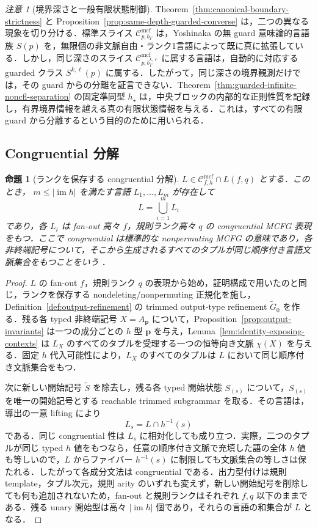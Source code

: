 \documentclass[11pt,a4paper]{ltjsarticle}
\numberwithin{equation}{section}
\theoremstyle{plain}
\newtheorem{proposition}[theorem]{命題}
\theoremstyle{definition}
\theoremstyle{remark}
\newtheorem{remark}[theorem]{注意}
\newcommand{\Cmcf}[2]{\mathcal{C}^{\mathrm{mcf}}_{#1,#2}}
\begin{document}
\begin{remark}[境界深さと一般有限状態制御]
Theorem~\ref{thm:canonical-boundary-strictness} と Proposition~\ref{prop:same-depth-guarded-converse} は，二つの異なる現象を切り分ける．標準スライス $\Cmcf{p}{b_\Gamma}$ は，Yoshinaka の無 guard 意味論的言語族 $S(p)$ を，無限個の非文脈自由・ランク1言語によって既に真に拡張している．しかし，同じ深さのスライス $\Cmcf{p}{b_\Gamma^{k,\ell}}$ に属する言語は，自動的に対応する guarded クラス $S^{k,\ell}(p)$ に属する．したがって，同じ深さの境界観測だけでは，その guard からの分離を証言できない．Theorem~\ref{thm:guarded-infinite-noncfl-separation} の固定準同型 $h_\star$ は，中央ブロックの内部的な正則性質を記録し，有界境界情報を越える真の有限状態情報を与える．これは，すべての有限 guard から分離するという目的のために用いられる．
\end{remark}

\subsection{Congruential 分解}
\begin{proposition}[ランクを保存する congruential 分解]
\label{prop:congruential-decomposition}
\(L\in\Cmcf{f}{h}\cap L(f,q)\) とする．このとき，
\(m\le |\operatorname{im}h|\) を満たす言語
\(L_1,\ldots,L_m\) が存在して
\[
  L=\bigcup_{i=1}^m L_i
\]
であり，各 \(L_i\) は fan-out 高々 \(f\)，規則ランク高々 \(q\) の congruential MCFG 表現をもつ．ここで congruential は標準的な nonpermuting MCFG の意味であり，各非終端記号について，そこから生成されるすべてのタプルが同じ順序付き言語文脈集合をもつことをいう
\cite{Yoshinaka2010,ClarkYoshinaka2016}．
\end{proposition}

\begin{proof}
\(L\) の fan-out \(f\)，規則ランク \(q\) の表現から始め，証明構成で用いたのと同じ，ランクを保存する nondeleting/nonpermuting 正規化を施し，Definition~\ref{def:output-refinement} の trimmed output-type refinement \(\widetilde G_0\) を作る．残る各 typed 非終端記号 \(X=A_{\mathbf p}\) について，Proposition~\ref{prop:output-invariants} は一つの成分ごとの \(h\) 型 \(\mathbf p\) を与え，Lemma~\ref{lem:identity-exposing-contexts} は \(L_X\) のすべてのタプルを受理する一つの恒等向き文脈 \(\chi(X)\) を与える．固定 \(h\) 代入可能性により，\(L_X\) のすべてのタプルは \(L\) において同じ順序付き文脈集合をもつ．

次に新しい開始記号 \(\widetilde S\) を除去し，残る各 typed 開始状態 \(S_{(s)}\) について，\(S_{(s)}\) を唯一の開始記号とする reachable trimmed subgrammar を取る．その言語は，導出の一意 lifting により
\[
  L_s=L\cap h^{-1}(s)
\]
である．同じ congruential 性は \(L_s\) に相対化しても成り立つ．実際，二つのタプルが同じ typed \(h\) 値をもつなら，任意の順序付き文脈で充填した語の全体 \(h\) 値も等しいので，\(L\) からファイバー \(h^{-1}(s)\) に制限しても文脈集合の等しさは保たれる．したがって各成分文法は congruential である．出力型付けは規則 template，タプル次元，規則 arity のいずれも変えず，新しい開始記号を削除しても何も追加されないため，fan-out と規則ランクはそれぞれ \(f,q\) 以下のままである．残る unary 開始型は高々 \(|\operatorname{im}h|\) 個であり，それらの言語の和集合が \(L\) となる．
\end{proof}
\end{document}
